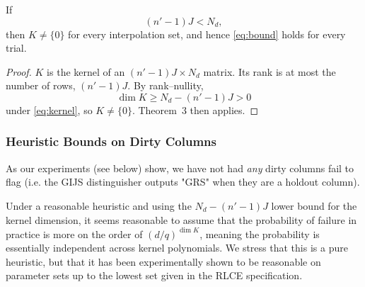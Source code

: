 \begin{corollary}
    If
    \begin{equation}
        (n'-1)J < N_d,
        \label{eq:kernel}
    \end{equation}
    then $K \ne \{0\}$ for every interpolation set, and hence
    \eqref{eq:bound} holds for every trial.
\end{corollary}

\begin{proof}
    $K$ is the kernel of an $(n'-1)J \times N_d$ matrix. Its rank
    is at most the number of rows, $(n'-1)J$. By rank--nullity,
    \[
        \dim K \ge N_d - (n'-1)J > 0
    \]
    under \eqref{eq:kernel}, so $K \ne \{0\}$. Theorem~3 then
    applies.
\end{proof}


\subsubsection{Heuristic Bounds on Dirty Columns}\label{sec:heuristic}

As our experiments (see below) show, we have not had \emph{any} dirty columns 
fail to flag (i.e. the GIJS distinguisher outputs "GRS" when they are a holdout column). 

Under a reasonable heuristic and using the $N_d - (n'-1)J$ lower bound for the kernel dimension, it seems 
reasonable to assume that the probability of failure in practice is more on the order of $(d/q)^{\dim K}$, 
meaning the probability is essentially independent across kernel polynomials. We stress
that this is a pure heuristic, but that it has been experimentally shown to be reasonable on 
parameter sets up to the lowest set given in the RLCE specification. 
